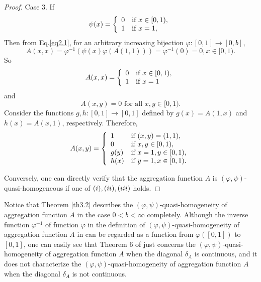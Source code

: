 \documentclass[12pt]{article}
\begin{document}
\begin{proof}
Case 3. If $$\psi(x)=\left\{\begin{array}{ll}
0 & {\mbox{\scriptsize\normalsize if  } x \in[0, 1),}\\
1 & {\mbox{\scriptsize\normalsize if  } x=1,}
\end{array}
\right.$$  Then from Eq.\eqref{eq2.1}, for an arbitrary increasing bijection $\varphi:[0, 1] \rightarrow[0, b]$,
$$A(x, x) =\varphi^{-1}(\psi(x)\varphi(A(1, 1)))=\varphi^{-1}(0)=0, x \in[0, 1).$$
So
\begin{equation*}
A(x,x)=\left\{\begin{array}{ll}
0 & {\mbox{\scriptsize\normalsize if  }x\in[0, 1)},\\
1 & {\mbox{\scriptsize\normalsize if  }  x=1}
\end{array}
\right.
\end{equation*}
and
$$A(x,y)=0 \mbox{ for all } x,y \in[0, 1).$$
Consider the functions $g,h:[0, 1] \rightarrow[0, 1]$ defined by $g(x)=A(1,x)$ and $h(x)=A(x,1)$, respectively. Therefore,
\begin{equation*}
A(x,y)=\left\{\begin{array}{ll}
1 & {\mbox{\scriptsize\normalsize if  } (x,y)=(1,1)},\\
0 & {\mbox{\scriptsize\normalsize if  } x,y \in[0, 1)},\\
g(y) & {\mbox{\scriptsize\normalsize if  } x=1, y\in[0, 1)},\\
h(x) & {\mbox{\scriptsize\normalsize if  } y=1, x\in[0, 1)}.
\end{array}
\right.
\end{equation*}

Conversely, one can directly verify that the aggregation function $A$ is $(\varphi, \psi)$-quasi-homogeneous if one of $(\romannumeral 1), (\romannumeral 2), (\romannumeral 3) $ holds.
\end{proof}

Notice that Theorem \ref{th3.2} describes the $(\varphi, \psi)$-quasi-homogeneity of aggregation function $A$ in the case $0<b<\infty$ completely. Although the inverse function $\varphi^{-1}$ of function $\varphi$ in the definition of $(\varphi, \psi)$-quasi-homogeneity of aggregation function $A$ in \cite{Su2022} can be regarded as a function from $\varphi([0,1])$ to $[0,1]$, one can easily see that Theorem 6 of \cite{Su2022} just concerns the $(\varphi, \psi)$-quasi-homogeneity of aggregation function $A$ when the diagonal $\delta_{A}$ is continuous, and it does not characterize the $(\varphi, \psi)$-quasi-homogeneity of aggregation function $A$ when the diagonal $\delta_{A}$ is not continuous.
\end{document}
